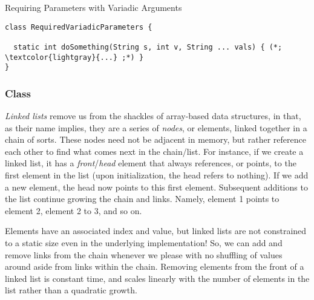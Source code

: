 
\begin{cl}[]{Requiring Parameters with Variadic Arguments}
\begin{lstlisting}[language=MyJava]
class RequiredVariadicParameters {

  static int doSomething(String s, int v, String ... vals) { (*; \textcolor{lightgray}{...} ;*) }
}
\end{lstlisting}
\end{cl}

\subsubsection*{ Class}
\textit{Linked lists} remove us from the shackles of array-based data structures, in that, as their name implies, they are a series of \textit{nodes}, or elements, linked together in a chain of sorts. These nodes need not be adjacent in memory, but rather reference each other to find what comes next in the chain/list. For instance, if we create a linked list, it has a \textit{front}/\textit{head} element that always references, or points, to the first element in the list (upon initialization, the head refers to nothing). If we add a new element, the head now points to this first element. Subsequent additions to the list continue growing the chain and links. Namely, element 1 points to element 2, element 2 to 3, and so on. 

Elements have an associated index and value, but linked lists are not constrained to a static size even in the underlying implementation! So, we can add and remove links from the chain whenever we please with no shuffling of values around aside from links within the chain. Removing elements from the front of a linked list is constant time, and scales linearly with the number of elements in the list rather than a quadratic growth.

